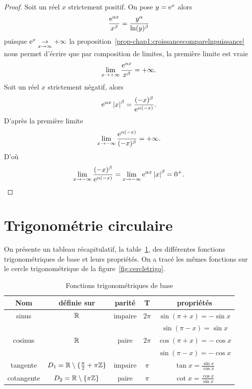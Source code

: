 \begin{proof}
  Soit un réel $x$ strictement positif. On pose $y=\operatorname{e}^{x}$ alors
  \begin{equation}
    \frac{\operatorname{e}^{\alpha x}}{x^\beta}=\frac{y^\alpha}{\ln(y)^\beta}
  \end{equation}
  puisque $\operatorname{e}^{x} \underset{x \to \infty}{\rightarrow}+\infty$ la proposition~\ref{prop-chap1:croissancecomparelnpuissance} nous permet d'écrire que par composition de limites, la première limite est vraie
  \begin{equation}
    \lim\limits_{x \to + \infty} \frac{\operatorname{e}^{\alpha x}}{x^\beta}=+\infty.
  \end{equation}
  Soit un réel $x$ strictement négatif, alors
  \begin{equation}
    \operatorname{e}^{\alpha x}\left\lvert x\right\rvert^\beta=\frac{(-x)^\beta}{\operatorname{e}^{\alpha(-x)}}.
  \end{equation}
  D'après la première limite
  \begin{equation}
    \lim\limits_{x \to - \infty} \frac{\operatorname{e}^{\alpha (-x)}}{(-x)^\beta}=+\infty.
  \end{equation}
  D'où
  \begin{equation}
    \lim\limits_{x\to -\infty}\frac{(-x)^\beta}{\operatorname{e}^{\alpha (-x)}}=\lim\limits_{x \to -\infty} \operatorname{e}^{\alpha x} \left\lvert x\right\rvert^\beta=0^+.
  \end{equation}
\end{proof}
%
\section{Trigonométrie circulaire}
\label{sec:chap1-trigocirc}
On présente un tableau récapitulatif, la table~\ref{tab:fonctiontrigo}, des différentes fonctions trigonométriques de base et leurs propriétés. On a tracé les mêmes fonctions sur le cercle trigonométrique de la figure~\ref{fig:cercletrigo}.
\begin{table}[!h]
  \centering
  \begin{tabular}{|c|c|c|c|c|}
    \hline
    Nom & définie sur & parité & T & propriétés \\ \hline
    sinus & $\mathbb{R}$ & impaire & $2\pi$ & $\sin(\pi+x)=-\sin x$ \\
    & & & & $\sin(\pi-x)=\sin x$ \\ \hline
    cosinus & $\mathbb{R}$ & paire & $2\pi$ & $\cos(\pi+x)=-\cos x$\\
    & & & & $ \sin(\pi-x)=-\cos x$ \\ \hline
    tangente & $D_1=\mathbb{R}\setminus\{\frac{\pi}{2}+\pi \mathbb{Z}\}$ & impaire & $\pi$ & $\tan x =\frac{\sin x}{\cos x}$ \\ \hline
    cotangente & $D_2=\mathbb{R}\setminus\{\pi \mathbb{Z}\}$ & paire & $\pi$ & $\cot x =\frac{\cos x}{\sin x}$ \\ \hline
  \end{tabular}
  \caption{Fonctions trigonométriques de base}
  \label{tab:fonctiontrigo}
\end{table}

